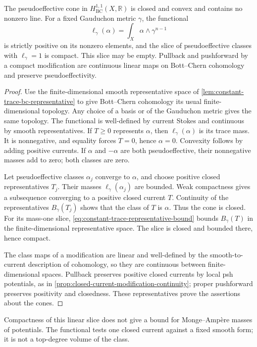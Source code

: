 \begin{proposition}\label{prop:psef-cone-compact-base}
The pseudoeffective cone in $H^{1,1}_{\mathrm{BC}}(X,\mathbb R)$ is closed and convex and contains no nonzero line. For a fixed Gauduchon metric $\gamma$, the functional
\[
 \ell_\gamma(\alpha)=\int_X\alpha\wedge\gamma^{n-1}
\]
is strictly positive on its nonzero elements, and the slice of pseudoeffective classes with $\ell_\gamma=1$ is compact. This slice may be empty. Pullback and pushforward by a compact modification are continuous linear maps on Bott--Chern cohomology and preserve pseudoeffectivity.
\end{proposition}
\begin{proof}
Use the finite-dimensional smooth representative space of \cref{lem:constant-trace-bc-representative} to give Bott--Chern cohomology its usual finite-dimensional topology. Any choice of a basis or of the Gauduchon metric gives the same topology. The functional is well-defined by current Stokes and continuous by smooth representatives. If $T\geq0$ represents $\alpha$, then $\ell_\gamma(\alpha)$ is its trace mass. It is nonnegative, and equality forces $T=0$, hence $\alpha=0$. Convexity follows by adding positive currents. If $\alpha$ and $-\alpha$ are both pseudoeffective, their nonnegative masses add to zero; both classes are zero.

Let pseudoeffective classes $\alpha_j$ converge to $\alpha$, and choose positive closed representatives $T_j$. Their masses $\ell_\gamma(\alpha_j)$ are bounded. Weak compactness gives a subsequence converging to a positive closed current $T$. Continuity of the representatives $B_\gamma(T_j)$ shows that the class of $T$ is $\alpha$. Thus the cone is closed. For its mass-one slice, \eqref{eq:constant-trace-representative-bound} bounds $B_\gamma(T)$ in the finite-dimensional representative space. The slice is closed and bounded there, hence compact.

The class maps of a modification are linear and well-defined by the smooth-to-current description of cohomology, so they are continuous between finite-dimensional spaces. Pullback preserves positive closed currents by local psh potentials, as in \cref{prop:closed-current-modification-continuity}; proper pushforward preserves positivity and closedness. These representatives prove the assertions about the cones.
\end{proof}

Compactness of this linear slice does not give a bound for Monge--Amp\`ere masses of potentials. The functional tests one closed current against a fixed smooth form; it is not a top-degree volume of the class.
